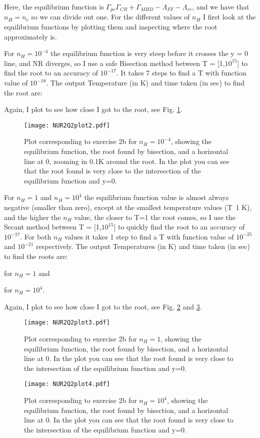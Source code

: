 Here, the equilibrium function is $\Gamma_{pe} \Gamma_{CR} + \Gamma_{MHD} - \Lambda_{FF} - \Lambda_{rr}$, and we have that $n_H = n_e$ so we can divide out one. 
For the different values of $n_H$ I first look at the equilibrium functions by plotting them and inspecting where the root approximately is. 

For $n_H = 10^{-4}$ the equilibrium function is very steep before it crosses the y = 0 line, and NR diverges, so I use a safe Bisection method between T = [1,$10^{15}$] to find the root to an accuracy of $10^{-17}$. It takes 7 steps to find a T with function value of $10^{-18}$.
The output Temperature (in K) and time taken (in sec) to find the root are:


Again, I plot to see how close I got to the root, see Fig. \ref{fig:fig2}.

\begin{figure}[h!]
  \centering
  \texttt{[image: NUR2Q2plot2.pdf]}
  \caption{Plot corresponding to exercise 2b for $n_H = 10^{-4}$, showing the equilibrium function, the root found by bisection, and a horizontal line at 0, zooming in 0.1K around the root. In the plot you can see that the root found is very close to the intersection of the equilibrium function and y=0.}
  \label{fig:fig2}
\end{figure} 


For $n_H = 1$ and $n_H = 10^4$ the equilibrium function value is almost always negative (smaller than zero), except at the smallest temperature values (T~1 K), and the higher the $n_H$ value, the closer to T=1 the root comes, so I use the Secant method between T = [1,$10^{15}$] to quickly find the root to an accuracy of $10^{-17}$. 
For both $n_H$ values it takes 1 step to find a T with function value of $10^{-25}$ and $10^{-21}$ respectively.
The output Temperatures (in K) and time taken (in sec) to find the roots are:

for $n_H = 1$ and 

for $n_H = 10^4$.

Again, I plot to see how close I got to the root, see Fig. \ref{fig:fig3} and \ref{fig:fig4}.


\begin{figure}[h!]
  \centering
  \texttt{[image: NUR2Q2plot3.pdf]}
  \caption{Plot corresponding to exercise 2b for $n_H = 1$, showing the equilibrium function, the root found by bisection, and a horizontal line at 0. In the plot you can see that the root found is very close to the intersection of the equilibrium function and y=0.}
  \label{fig:fig3}
\end{figure} 

\begin{figure}[h!]
  \centering
  \texttt{[image: NUR2Q2plot4.pdf]}
  \caption{Plot corresponding to exercise 2b for $n_H = 10^4$, showing the equilibrium function, the root found by bisection, and a horizontal line at 0. In the plot you can see that the root found is very close to the intersection of the equilibrium function and y=0.}
  \label{fig:fig4}
\end{figure} 
